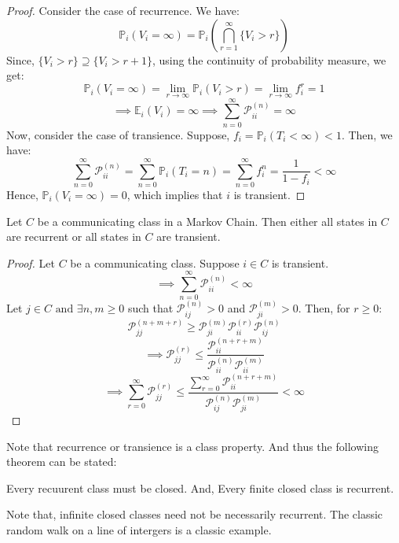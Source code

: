 \begin{proof}
    Consider the case of recurrence. We have:
    \[
        \mathbb{P} _i (V_i = \infty ) = \mathbb{P} _i \left( 
            \bigcap_{r=1}^{\infty} \{V_i > r\}
         \right) 
    \]
    Since, \(\{V_i > r\} \supseteq \{V_i > r+1\}\), using the continuity of probability measure, we get:
    \[
        \mathbb{P}_i (V_i = \infty) = \lim_{r \to \infty} \mathbb{P}_i (V_i > r) = \lim_{r \to \infty} f_i^r = 1
    \]
    \[
        \implies \mathbb{E} _i (V_i) = \infty \implies \sum_{n=0}^{\infty} \mathcal{P}_{ii}^{(n)} = \infty
    \]
    Now, consider the case of transience. Suppose, \(f_i = \mathbb{P}_i(T_i < \infty ) < 1\). Then, we have:
    \[
        \sum_{n=0}^{\infty} \mathcal{P}_{ii}^{(n)} = \sum_{n=0}^{\infty}
         \mathbb{P}_i(T_i = n) = \sum_{n=0}^{\infty} f_i^n = \frac{1}{1-f_i} < \infty
    \]
    Hence, \(\mathbb{P}_i (V_i = \infty) = 0\), which implies that \(i\) is transient. 
\end{proof}

\begin{theorem}
    Let \(C\) be a communicating class in a Markov Chain. Then either all states in \(C\)
    are recurrent or all states in \(C\) are transient.
\end{theorem}
\begin{proof}
    Let \(C\) be a communicating class. Suppose \(i \in C\) is transient.
    \[
        \implies \sum_{n=0}^{\infty} \mathcal{P}_{ii}^{(n)} < \infty
    \]
    Let \(j \in C \text{ and }  \exists n,m \geq 0 \) such that \(\mathcal{P}_{ij}^{(n)} > 0\) and \(\mathcal{P}_{ji}^{(m)} > 0\).
    Then, for \(r \geq  0\):
    \[
        \mathcal{P}_{jj}^{(n+m+r)} \geq \mathcal{P}_{ji}^{(m)} \mathcal{P}_{ii}^{(r)} \mathcal{P}_{ij}^{(n)}
    \]
    \[
        \implies \mathcal{P}_{jj}^{(r)} \leq \frac{\mathcal{P}_{ii}^{(n + r + m)}}
        {\mathcal{P}_{ii}^{(n)} \mathcal{P}_{ii}^{(m)}}
    \]
    \[
        \implies \sum\limits_{r=0}^{\infty} \mathcal{P}_{jj}^{(r)} \leq \frac{\sum_{r=0}^{\infty} \mathcal{P}_{ii}^{(n + r + m)}}
        {\mathcal{P}_{ij}^{(n)} \mathcal{P}_{ji}^{(m)}} < \infty
    \]
\end{proof}
Note that recurrence or transience is a class property. And thus the following theorem can be stated:
\begin{theorem}
    Every recuurent class must be closed. And, Every finite closed class is recurrent.
\end{theorem}
Note that, infinite closed classes need not be necessarily recurrent. The classic random walk on a line of
intergers is a classic example.

